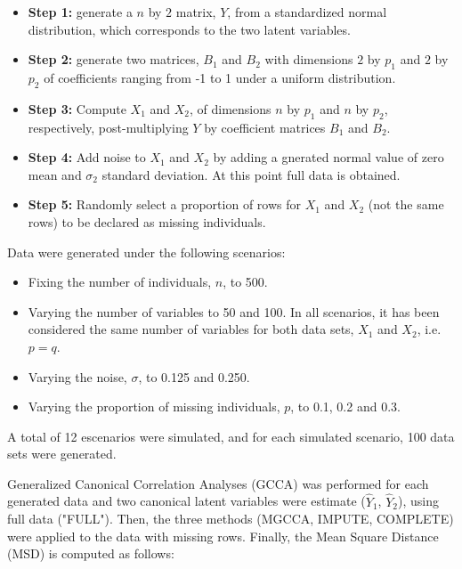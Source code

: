 \documentclass[article]{jss}
\begin{document}
\begin{itemize}

\item \textbf{Step 1:} generate a $n$ by $2$ matrix, $Y$, from a standardized normal distribution, which corresponds to the two latent variables.

\item \textbf{Step 2:} generate two matrices, $B_1$ and $B_2$ with dimensions $2$ by $p_1$ and $2$ by $p_2$ of coefficients ranging from -1 to 1 under a uniform distribution.

\item \textbf{Step 3:} Compute $X_1$ and $X_2$, of dimensions $n$ by $p_1$ and $n$ by $p_2$, respectively, post-multiplying $Y$ by coefficient matrices $B_1$ and $B_2$.

\item \textbf{Step 4:} Add noise to $X_1$ and $X_2$ by adding a gnerated normal value of zero mean and $\sigma_2$  standard deviation. At this point full data is obtained.

\item \textbf{Step 5:} Randomly select a proportion of rows for $X_1$ and $X_2$ (not the same rows) to be declared as missing individuals.

\end{itemize}

Data were generated under the following scenarios:

\begin{itemize}

\item Fixing the number of individuals, $n$, to 500.

\item Varying the number of variables to 50 and 100. In all scenarios, it has been considered the same number of variables for both data sets, $X_1$ and $X_2$, i.e. $p=q$.

\item Varying the noise, $\sigma$, to 0.125 and 0.250.

\item Varying the proportion of missing individuals, $p$, to 0.1, 0.2 and 0.3.

\end{itemize}

A total of 12 escenarios were simulated, and for each simulated scenario, 100 data sets were generated.

Generalized Canonical Correlation Analyses (GCCA) was performed for each generated data and two canonical latent variables were estimate ($\hat{Y}_1$, $\hat{Y}_2$), using full data ("FULL"). Then, the three methods (MGCCA, IMPUTE, COMPLETE) were applied to the data with missing rows. Finally, the Mean Square Distance (MSD) is computed as follows:
\end{document}

